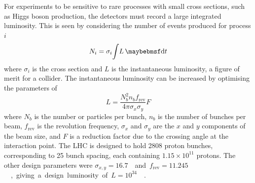 For experiments to be sensitive to rare processes with small cross sections, such as Higgs 
boson production, the detectors must record a large integrated luminosity. This is seen by 
considering the number of events produced for process $i$
\begin{equation}
	N_i = \sigma_i \! \int \! L \, \diff t
\end{equation}
where $\sigma_i$ is the cross section and $L$ is the instantaneous luminosity, a figure of 
merit for a collider. The instantaneous luminosity can be increased by optimising the
parameters of
\begin{equation}
	L = \frac{N_b^2 n_b f_{\text{rev}}}{4\pi \sigma_x \sigma_y} F
\end{equation}
where $N_b$ is the number or particles per bunch, $n_b$ is the number of bunches per beam, 
$f_{\text{rev}}$ is the revolution frequency, $\sigma_x$ and $\sigma_y$ are the $x$ and $y$
components of the beam size, and $F$ is a reduction factor due to the crossing angle at 
the interaction point. The \ac{LHC} is designed to hold 2808 proton bunches, corresponding 
to \unit{25}{\nano\second} bunch spacing, each containing $1.15\times10^{11}$ protons. The 
other design parameters were \unit{$\sigma_{x,y} = 16.7$}{\micro\metre} and 
\unit{$f_{\text{rev}} = 11.245$}{\kHz}, giving a design luminosity of 
\unit{$L = 10^{34}$}{\lumiunits} \cite{LHC}.

